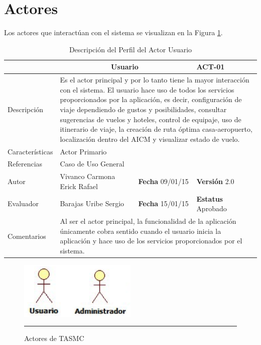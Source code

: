 \section{Actores}

Los actores que interactúan con el sistema se visualizan en la Figura \ref{fig:actoresTASMC}.

\begin{table}[htbp]
	\begin{center}
		\begin{tabular}{|p{2.5cm}|p{6.4cm}|p{2cm}|p{2cm}|}
			\hline
				\rowcolor[RGB]{255,102,102}{Actor}&\multicolumn{2}{c}{Usuario}&{\textbf{ACT-01}}\\
			\hline
				{Descripción}&\multicolumn{3}{p{11.2cm}|}{
			Es el actor principal y por lo tanto tiene la mayor interacción con el sistema. El usuario hace uso de todos 				los servicios proporcionados por la aplicación, es decir, configuración de viaje dependiendo de gustos y 					posibilidades, consultar sugerencias de vuelos y hoteles, control de equipaje, uso de itinerario de viaje, la 				creación de ruta óptima casa-aeropuerto, localización dentro del AICM y visualizar estado de vuelo.}\\
			\hline
				{Características}&\multicolumn{3}{p{11.2cm}|}{Actor Primario}\\
			\hline
				{Referencias}&\multicolumn{3}{p{11.2cm}|}{Caso de Uso General}\\
			\hline
				{Autor}&{Vivanco Carmona Erick Rafael}&{\textbf{Fecha} 09/01/15}&{\textbf{Versión} 2.0}\\
			\hline
				{Evaluador}&{Barajas Uribe Sergio}&{\textbf{Fecha} 15/01/15}&{\textbf{Estatus} Aprobado}\\
			\hline
				{Comentarios}&\multicolumn{3}{p{11.2cm}|}{Al ser el actor principal, la funcionalidad de la aplicación 						únicamente cobra sentido cuando el usuario inicia la aplicación y hace uso de los servicios 										proporcionados por el sistema.}\\
			\hline
		\end{tabular}
	\end{center}
	\caption[Descripción del Perfil del Actor Usuario]{Descripción del Perfil del Actor Usuario}
    	\label{tab:perfilUsuario}
\end{table}

\begin{figure}[htbp]
	\centering
		\includegraphics[width=0.5\textwidth]{Figuras/actores.png}
		\rule{30em}{0.5pt}
	\caption[Actores de TASMC]{Actores de TASMC}
	\label{fig:actoresTASMC}
\end{figure}

